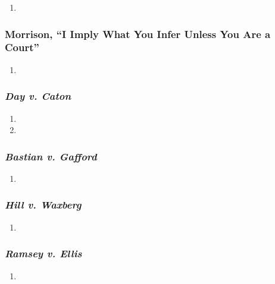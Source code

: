 \begin{enumerate}
    \item %
\end{enumerate}

\subsubsection{Morrison, ``I Imply What You Infer Unless You Are a Court''}

\begin{enumerate}
    \item %
\end{enumerate}

\subsubsection{\emph{Day v. Caton}}

\begin{enumerate}
    \item %
    \item %
\end{enumerate}

\subsubsection{\emph{Bastian v. Gafford}}

\begin{enumerate}
    \item %
\end{enumerate}

\subsubsection{\emph{Hill v. Waxberg}}

\begin{enumerate}
    \item %
\end{enumerate}

\subsubsection{\emph{Ramsey v. Ellis}}

\begin{enumerate}
    \item %
\end{enumerate}


